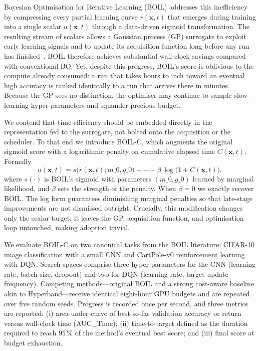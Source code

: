 \documentclass{article} %
\begin{document}
Bayesian Optimisation for Iterative Learning (BOIL) addresses this inefficiency by compressing every partial learning curve \(r(\mathbf{x}, t)\) that emerges during training into a single scalar \(u(\mathbf{x}, t)\) through a data-driven sigmoid transformation. The resulting stream of scalars allows a Gaussian process (GP) surrogate to exploit early learning signals and to update its acquisition function long before any run has finished~\@.\cite{nguyen-2019-bayesian} BOIL therefore achieves substantial wall-clock savings compared with conventional BO\@. Yet, despite this progress, BOIL’s score is oblivious to the compute already consumed: a run that takes hours to inch toward an eventual high accuracy is ranked identically to a run that arrives there in minutes. Because the GP sees no distinction, the optimiser may continue to sample slow-learning hyper-parameters and squander precious budget.

We contend that time-efficiency should be embedded directly in the representation fed to the surrogate, not bolted onto the acquisition or the scheduler. To that end we introduce BOIL-C, which augments the original sigmoid score with a logarithmic penalty on cumulative elapsed time \(C(\mathbf{x}, t)\). Formally
\[
  u(\mathbf{x}, t) = s\big(r(\mathbf{x}, t); m\_0, g\_0\big) --- \beta\, \log\!\big(1 + C(\mathbf{x}, t)\big),
\]
where \(s(\cdot)\) is BOIL’s sigmoid with parameters \((m\_0, g\_0)\) learned by marginal likelihood, and \(\beta\) sets the strength of the penalty. When \(\beta = 0\) we exactly recover BOIL\@. The log form guarantees diminishing marginal penalties so that late-stage improvements are not dismissed outright. Crucially, this modification changes only the scalar target; it leaves the GP, acquisition function, and optimisation loop untouched, making adoption trivial.

We evaluate BOIL-C on two canonical tasks from the BOIL literature: CIFAR-10 image classification with a small CNN and CartPole-v0 reinforcement learning with DQN\@. Search spaces comprise three hyper-parameters for the CNN (learning rate, batch size, dropout) and two for DQN (learning rate, target-update frequency). Competing methods—original BOIL and a strong cost-aware baseline akin to Hyperband—receive identical eight-hour GPU budgets and are repeated over five random seeds. Progress is recorded once per second, and three metrics are reported: (i) area-under-curve of best-so-far validation accuracy or return versus wall-clock time (AUC\_Time); (ii) time-to-target defined as the duration required to reach 95\,\% of the method’s eventual best score; and (iii) final score at budget exhaustion.
\end{document}
